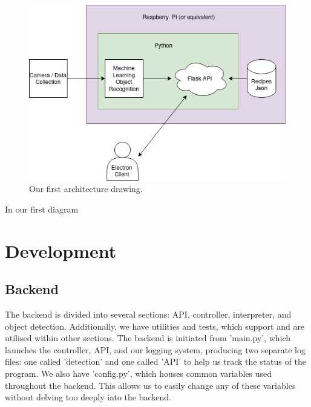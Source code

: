 \documentclass{article}
\begin{document}
    \begin{figure}
      \includegraphics[scale=0.5]{assets/first-architecture.png}
      \caption{Our first architecture drawing.}
      \label{fig:architecture1}
    \end{figure}

    In our first diagram 
    



    \section{Development}
    \subsection{Backend}
        The backend is divided into several sections: API, controller, interpreter, and object detection. Additionally, we have utilities and tests, which support and are utilised within other sections. The backend is initiated from 'main.py', which launches the controller, API, and our logging system, producing two separate log files: one called 'detection' and one called 'API' to help us track the status of the program. We also have 'config.py', which houses common variables used throughout the backend. This allows us to easily change any of these variables without delving too deeply into the backend.
\end{document}
